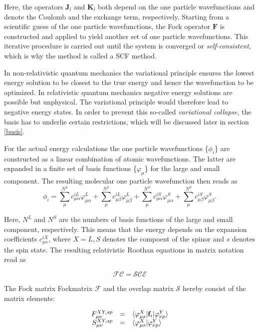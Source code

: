 Here, the operators $\mathbf{J}_l$ and $\mathbf{K}_l$ both depend on the one
particle wavefunctions and denote the Coulomb and the
exchange term, respectively.
Starting from a scientific guess of the one particle wavefunctions, the Fock operator
$\mathbf{F}$ is constructed and applied to yield another set of one particle
wavefunctions. This iterative procedure is carried out until the system is
converged or \emph{self-consistent}, which is why the method is called a
\ac{SCF} method. \cite{szabo}

In non-relativistic quantum mechanics the variational principle ensures the
lowest energy solution to be closest to the true energy and hence the wavefunction
to be optimized. In relativistic quantum mechanics negative energy solutions
are possible but unphysical. The variational principle would therefore lead to
negative energy states. In order to prevent this so-called \emph{variational collapse},
the basis has to underlie certain restrictions, which will be discussed later in
section \ref{basis}.
 
For the actual energy calculations the one particle wavefunctions \{$\phi_i$\}
are constructed as a linear combination of atomic wavefunctions. The latter are
expanded in a finite set of basis functions \{$\varphi_\mu$\} for the large and small
component. The resulting molecular one particle wavefunction then reads as
\begin{equation}
\phi_i = \sum\limits_\mu^{N^L} c_{\mu\alpha}^{iL} \varphi_{\mu\alpha}^L +  \sum\limits_\mu^{N^L} c_{\mu\beta}^{iL} \varphi_{\mu\beta}^L + \sum\limits_\mu^{N^S} c_{\mu\alpha}^{iS} \varphi_{\mu\alpha}^S + \sum\limits_\mu^{N^S} c_{\mu\beta}^{iS} \varphi_{\mu\beta}^S.
\end{equation}

Here, $N^L$ and $N^S$ are the numbers of basis functions of the large and small
component, respectively. This means that the energy depends on the expansion
coefficients $c_{\mu s}^{iX}$, where $X=L,S$ denotes the compoent of the spinor and
$s$ denotes the spin state. The resulting relativistic Roothan equations in matrix
notation read as

\begin{equation}
\mathcal{FC} = \mathcal{SCE}
\end{equation}

The Fock matrix Fockmatrix $\mathcal{F}$ and the overlap matrix $\mathcal{S}$
hereby consist of the matrix elements:

\begin{equation}\begin{array}{rcl}\label{roothanm}
F^{XY,sp}_{\mu\nu} &=& \braket{\varphi^X_{\mu s}|\mathbf{f}_i|\varphi_{\nu p}^Y}\\
S^{XY,sp}_{\mu\nu} &=& \braket{\varphi^X_{\mu s}|\varphi_{\nu p}^Y}
\end{array}\end{equation}



